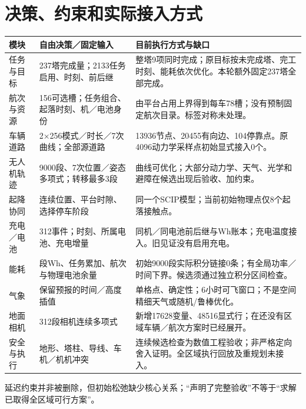\section*{决策、约束和实际接入方式}
\begin{center}\small\begin{tabular}{p{23mm}p{61mm}p{73mm}}\toprule 模块 & 自由决策／固定输入 & 目前执行方式与缺口\\\midrule
任务与目标 & 237塔完成量；2133任务启用、时刻、前后继 & 整塔9项同时完成；原目标按未完成塔、完工时刻、能耗依次优化。本轮额外固定237塔全部完成。\\
航次与资源 & 156可选槽；任务组合、起落时刻、机／电池身份 & 由平台占用上界得到每车78槽；没有预制固定航次目录。标签对称未处理。\\
车辆道路 & 2×256模式／时长／7次曲线；全部源道路 & 13936节点、20455有向边、104停靠点。原4096动力学采样点初始显式接入0个。\\
无人机轨迹 & 9000段、7次位置／姿态多项式；转移最多3段 & 曲线可优化；大部分动力学、天气、光学和避障在候选出现后验收、加约束。\\
起降协同 & 连续位置、平台时隙、选择停车阶段 & 同一个SCIP模型；当前初始物理点仅8个起落接触点。\\
充电／电池 & 312事件；时刻、所属电池、充电增量 & 同机／同电池前后继与Wh账本；充电温度接入。旧见证没有启用充电。\\
能耗 & 段Wh、任务累加、航次与物理电池余量 & 初始9000段实际积分链接0条；有全局功率／时间下界。候选须通过独立积分区间检查。\\
气象 & 保留预报的时间／高度插值 & 单格点、确定性；6小时可飞窗口；不是空间精细天气或随机/鲁棒优化。\\
地面相机 & 312段相机连续多项式 & 新增17628变量、48516显式行；在还没有区域车辆／航次方案时已经展开。\\
安全与执行 & 地形、塔柱、导线、车机／机机冲突 & 连续候选检查为数值工程验收；非严格定向舍入证明。全区域执行回放及重规划未接入。\\
\bottomrule\end{tabular}\end{center}\small 延迟约束并非被删除，但初始松弛缺少核心关系；“声明了完整验收”不等于“求解已取得全区域可行方案”。
\clearpage
